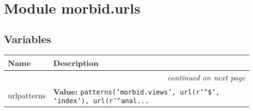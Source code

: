 %
%
%


\section{Module morbid.urls}

    \label{morbid:urls}


  \subsection{Variables}

    \vspace{-1cm}
\hspace{\varindent}\begin{longtable}{|p{\varnamewidth}|p{\vardescrwidth}|l}
\cline{1-2}
\cline{1-2} \centering \textbf{Name} & \centering \textbf{Description}& \\
\cline{1-2}
\endhead\cline{1-2}\multicolumn{3}{r}{\small\textit{continued on next page}}\\\endfoot\cline{1-2}
\endlastfoot\raggedright u\-r\-l\-p\-a\-t\-t\-e\-r\-n\-s\- & \raggedright \textbf{Value:} 
{\tt patterns('morbid.views', url(r'{\textasciicircum}\$', 'index'), url(r'{\textasciicircum}anal\texttt{...}}&\\
\cline{1-2}
\end{longtable}

